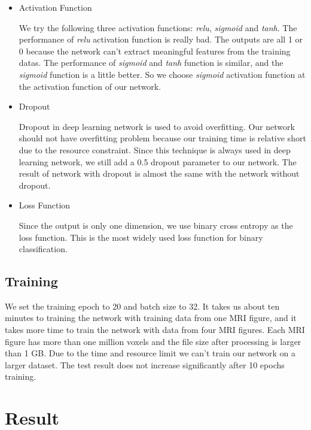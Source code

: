 \documentclass[10pt,twocolumn,letterpaper]{article}
\begin{document}
	\begin{itemize}
		\item Activation Function
		
		We try the following three activation functions: \textit{relu}, \textit{sigmoid} and \textit{tanh}. The performance of \textit{relu} activation function is really bad. The outputs are all 1 or 0 because the network can't extract meaningful features from the training datas. The performance of \textit{sigmoid} and \textit{tanh} function is similar, and the \textit{sigmoid} function is a little better. So we choose \textit{sigmoid} activation function at the activation function of our network.
		
		\item Dropout
		
		Dropout in deep learning network is used to avoid overfitting. Our network should not have overfitting problem because our training time is relative short due to the resource constraint. Since this technique is always used in deep learning network, we still add a 0.5 dropout parameter to our network. The result of network with dropout is almost the same with the network without dropout.
		
		\item Loss Function
		
		Since the output is only one dimension, we use binary cross entropy as the loss function. This is the most widely used loss function for binary classification.
		
	\end{itemize}
	
	\subsection{Training}
	
	We set the training epoch to 20 and batch size to 32. It takes us about ten minutes to training the network with training data from one MRI figure, and it takes more time to train the network with data from four MRI figures. Each MRI figure has more than one million voxels and the file size after processing is larger than 1 GB. Due to the time and resource limit we can't train our network on a larger dataset. The test result does not increase significantly after 10 epochs training. 
	
	
	\section{Result}
	
\end{document}
